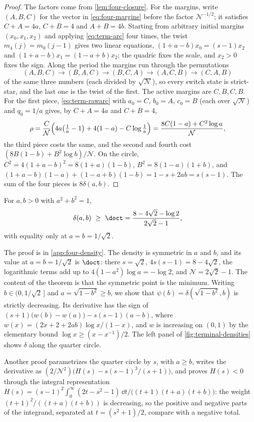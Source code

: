 \begin{proof}
The factors come from \cref{lem:four-closure}. For the margins, write $(A,B,C)$ for the vector in
\eqref{eq:four-margins} before the factor $\mathcal N^{-1/2}$; it satisfies $C+A=4a$, $C+B=4$ and
$A+B=4b$. Starting from arbitrary initial margins $(x_0,x_1,x_2)$ and applying
\eqref{eq:term-arc} four times, the twist $m_4(j)=m_0(j-1)$ gives two linear equations,
$(1+a-b)x_0=(s-1)x_2$ and $(1+a-b)x_1=(1-a+b)x_2$; the quadric fixes the scale, and $x_2>0$ fixes
the sign. Along the period the margins run through the permutations
\[
 (A,B,C)\to(B,A,C)\to(B,C,A)\to(A,C,B)\to(C,A,B)
\]
of the same three numbers (each divided by $\sqrt{\mathcal N}$), so every switch state is
strict-star, and the last one is the twist of the first. The active margins are $C,B,C,B$. For
the first piece, \eqref{eq:term-rawarc} with $a_0=C$, $b_0=A$, $c_0=B$ (each over
$\sqrt{\mathcal N}$) and $q_0=1/a$ gives, by $C+A=4a$ and $C+B=4$,
\[
 \rho=\frac{C}{\mathcal N}\Bigl(4a\bigl(\tfrac1a-1\bigr)+4(1-a)-C\log\tfrac1a\Bigr)
 =\frac{8C(1-a)+C^2\log a}{\mathcal N},
\]
the third piece costs the same, and the second and fourth cost $(8B(1-b)+B^2\log b)/\mathcal N$.
On the circle, $C^2=4(1+a-b)^2=8(1+a)(1-b)$, $B^2=8(1-a)(1+b)$, and
$(1+a-b)(1-a)+(1-a+b)(1-b)=1-s+2ab=s(s-1)$. The sum of the four pieces is $8\delta(a,b)$.
\end{proof}

\begin{theorem}\label{thm:four-density}
For $a,b>0$ with $a^2+b^2=1$,
\[
 \delta(a,b)\ \ge\ \doct=\frac{8-4\sqrt2-\log2}{2\sqrt2-1},
\]
with equality only at $a=b=1/\sqrt2$.
\end{theorem}

The proof is in \cref{app:four-density}. The density is symmetric in $a$ and $b$, and its value
at $a=b=1/\sqrt2$ is $\doct$: there $s=\sqrt2$, $4s(s-1)=8-4\sqrt2$, the logarithmic terms add
up to $4(1-a^2)\log a=-\log 2$, and $\mathcal N=2\sqrt2-1$. The content of the theorem is that
the symmetric point is the minimum. Writing $b\in(0,1/\sqrt2\,]$ and $a=\sqrt{1-b^2}\ge b$, we
show that $\psi(b)=\delta(\sqrt{1-b^2},b)$ is strictly decreasing. Its derivative has the sign
of $(s+1)\bigl(w(b)-w(a)\bigr)-s(s-1)(a-b)$, where $w(x)=(2x+2+2ab)\log x/(1-x)$, and $w$ is
increasing on $(0,1)$ by the elementary bound $\log x\ge(x-x^{-1})/2$. The left panel of
\cref{fig:terminal-densities} shows $\delta$ along the quarter circle.

\begin{remark}\label{rem:four-route}
Another proof \cite{Notes} parametrizes the quarter circle by $s$, with $a\ge b$, writes the
derivative as $(2/\mathcal N^2)\bigl(H(s)-s(s-1)^3/(s+1)\bigr)$, and proves $H(s)<0$ through the
integral representation
$H(s)=(s-1)^2\int_0^\infty(2t-s^2-1)\,\dd t/\bigl((t+1)(t+a)(t+b)\bigr)$: the weight
$(t+1)^2/((t+a)(t+b))$ is decreasing, so the positive and negative parts of the integrand,
separated at $t=(s^2+1)/2$, compare with a negative total.
\end{remark}

